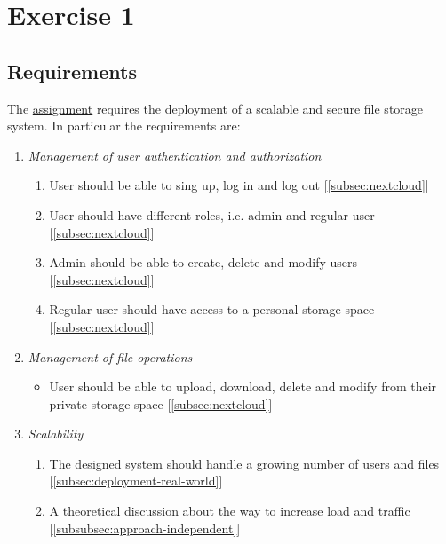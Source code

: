 \section{Exercise 1}

\subsection{Requirements}
\label{subsec:requirements}

The \href{https://github.com/IsacPasianotto/cloud-computing-assignment/blob/main/exercise01/assignment.md}{assignment} requires the deployment of a scalable and secure file storage system. In particular the requirements are:

\begin{enumerate}
    \itemsep0em
    \item \textit{Management of user authentication and authorization}
    \begin{enumerate}
        \itemsep0em
        \item User should be able to sing up, log in and log out [\ref{subsec:nextcloud}]
        \item User should have different roles, i.e. admin and regular user [\ref{subsec:nextcloud}]
        \item Admin should be able to create, delete and modify users [\ref{subsec:nextcloud}]
        \item Regular user should have access to a personal storage space [\ref{subsec:nextcloud}]
    \end{enumerate}

    \item \textit{Management of file operations}
    \begin{itemize}
        \itemsep0em
        \item User should be able to upload, download, delete and modify from their private storage space [\ref{subsec:nextcloud}]
    \end{itemize}

    \item \textit{Scalability}
    \begin{enumerate}
        \itemsep0em
        \item The designed system should handle a growing number of users and files [\ref{subsec:deployment-real-world}]
        \item A theoretical discussion about the way to increase load and traffic [\ref{subsubsec:approach-independent}]
    \end{enumerate}


\end{enumerate}
